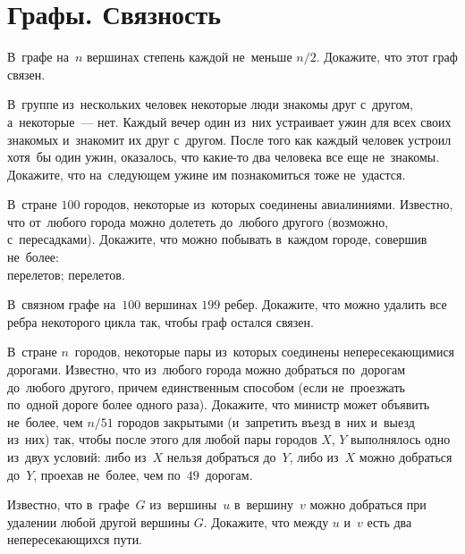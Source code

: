 
\section*{Графы. Связность}


\begin{problems}

\item
В~графе на~$n$ вершинах степень каждой не~меньше $n / 2$.
Докажите, что этот граф связен.

\item
В~группе из~нескольких человек некоторые люди знакомы друг с~другом,
а~некоторые~--- нет.
Каждый вечер один из~них устраивает ужин для всех своих знакомых и~знакомит их
друг с~другом.
После того как каждый человек устроил хотя~бы один ужин, оказалось, что
какие-то два человека все еще не~знакомы.
Докажите, что на~следующем ужине им познакомиться тоже не~удастся.

\item
В~стране $100$ городов, некоторые из~которых соединены авиалиниями.
Известно, что от~любого города можно долететь до~любого другого
(возможно, с~пересадками).
Докажите, что можно побывать в~каждом городе, совершив не~более:
\\
 перелетов;
\quad
{} перелетов.

\item
В~связном графе на~$100$ вершинах $199$ ребер.
Докажите, что можно удалить все ребра некоторого цикла так, чтобы граф остался
связен.

\item
В~стране $n$~городов, некоторые пары из~которых соединены непересекающимися
дорогами.
Известно, что из~любого города можно добраться по~дорогам до~любого другого,
причем единственным способом (если не~проезжать по~одной дороге более одного
раза).
Докажите, что министр может объявить не~более, чем $n / 51$ городов
закрытыми (и~запретить въезд в~них и~выезд из~них) так, чтобы после этого для
любой пары городов $X$, $Y$ выполнялось одно из~двух условий:
либо из~$X$ нельзя добраться до~$Y$,
либо из~$X$ можно добраться до~$Y$, проехав не~более, чем по~$49$~дорогам.

\item
Известно, что в~графе~$G$ из~вершины~$u$ в~вершину~$v$ можно добраться при
удалении любой другой вершины $G$.
Докажите, что между $u$ и~$v$ есть два непересекающихся пути.


\end{problems}
